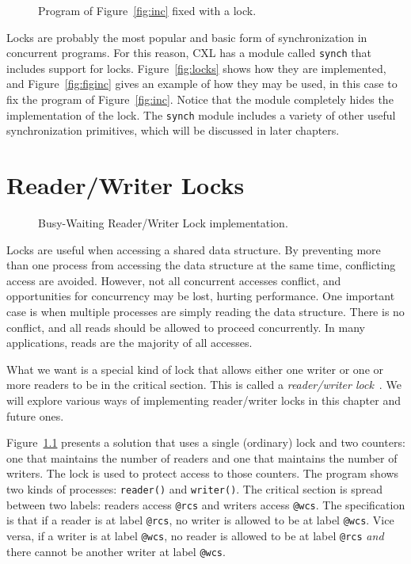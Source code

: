 \documentclass{report}
\newenvironment{code}{
\tcolorbox
}{
\endtcolorbox
}
\begin{document}
\begin{figure}
\begin{code}

\end{code}
\caption{Program of Figure~\ref{fig:inc} fixed with a lock.}
\label{fig:incfixed}
\end{figure}

Locks are probably the most popular and basic form of synchronization
in concurrent programs.  For this reason, CXL has a module called
\texttt{synch} that includes support for locks.
Figure~\ref{fig:locks} shows how they are implemented, and
Figure~\ref{fig:figinc} gives an example of how they may be used,
in this case to fix the program of Figure~\ref{fig:inc}.
Notice that the module completely hides the implementation of the
lock.
The \texttt{synch} module includes a variety of other useful
synchronization primitives, which will be discussed in later
chapters.

\chapter{Reader/Writer Locks}

\begin{figure}
\begin{code}

\end{code}
\caption{Busy-Waiting Reader/Writer Lock implementation.}
\label{fig:rwbusy}
\end{figure}

Locks are useful when accessing a shared data structure.  By preventing
more than one process from accessing the data structure at the same
time, conflicting access are avoided.  However, not all concurrent
accesses conflict, and opportunities for concurrency may be lost,
hurting performance.  One important case is when multiple processes
are simply reading the data structure.  There is no conflict, and
all reads should be allowed to proceed concurrently.  In many
applications, reads are the majority of all accesses.

What we want is a special kind of lock that allows either one writer
or one or more readers to be in the critical section.  This is called
a \emph{reader/writer lock}~\cite{courtois71}.
We will explore various ways of implementing reader/writer locks in
this chapter and future ones.

Figure~\ref{fig:rwbusy} presents a solution that uses a
single (ordinary) lock and two counters: one that maintains the number
of readers and one that maintains the number of writers.
The lock is used to protect access to those counters.
The program shows two kinds of processes: \texttt{reader()} and
\texttt{writer()}.  The critical section is spread between two
labels: readers access \texttt{@rcs} and writers access \texttt{@wcs}.
The specification is that if a reader is at label \texttt{@rcs},
no writer is allowed to be at label \texttt{@wcs}.  Vice versa, if
a writer is at label \texttt{@wcs}, no reader is allowed to be at
label \texttt{@rcs} \emph{and} there cannot be another writer at
label \texttt{@wcs}.
\end{document}

